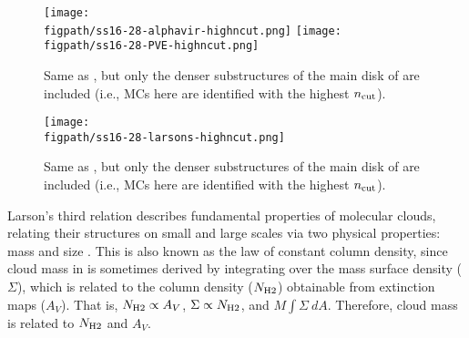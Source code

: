 \documentclass[iop]{emulateapj}
\begin{document}
\begin{figure*}[htbp]
\centering
\texttt{[image: \\figpath/ss16-28-alphavir-highncut.png]}
\texttt{[image: \\figpath/ss16-28-PVE-highncut.png]}
\caption{
Same as , but only the denser substructures of the main disk of \flower are included
(i.e., MCs here are identified with the highest $n_{\rm cut}$).
\label{fig:alpha16-28-highncut}}
\end{figure*}

\begin{figure*}[htbp]
\centering
\texttt{[image: \\figpath/ss16-28-larsons-highncut.png]}
\caption{
Same as , but only the denser substructures of the main disk of \flower are included
(i.e., MCs here are identified with the highest $n_{\rm cut}$).
\label{fig:larsons16-28-highncut}}
\end{figure*}

Larson's third relation describes fundamental properties of molecular clouds, relating their structures on small and large scales 
via two physical properties: mass and size \citep{Larson81a, Mckee07a}. This is also known as the law of constant column density, 
since cloud mass in \obs is sometimes derived by integrating
over the mass surface density ($\Sigma$), which is related to the column density ($N_{\rm H2}$) obtainable from extinction maps ($A_V$).   
That is, $N_{\rm H2}\propto A_V$, $\Sigma\propto N_{\rm H2}$, and $M$\eq$\int \Sigma~dA$.
Therefore, cloud mass is related to $N_{\rm H2}$ and $A_V$.
\end{document}
